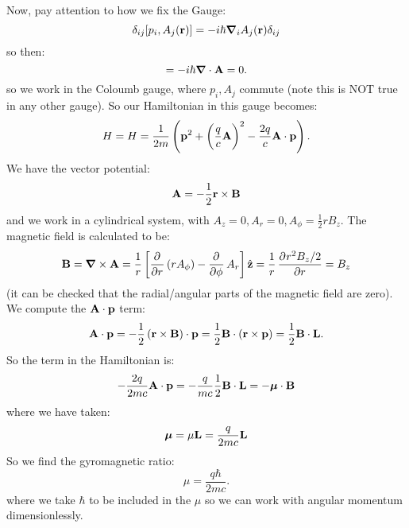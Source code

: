 Now, pay attention to how we fix the Gauge:
\begin{equation}
    \delta_{ij}[p_i, A_j(\v{r})] = -i\hbar \nabla_i A_j(\v{r})\delta_{ij}
\end{equation}
so then:
\begin{equation}
    [p_i, A_j] = -i\hbar \nabla \cdot \v{A} = 0.
\end{equation}
so we work in the Coloumb gauge, where $p_i, A_j$ commute (note this is NOT true in any other gauge). So our Hamiltonian in this gauge becomes:
\begin{equation}
    H =  H = \frac{1}{2m}\left(\mathbf{p}^2 + \left(\frac{q}{c}\mathbf{A}\right)^2 - \frac{2q}{c}\mathbf{A} \cdot \mathbf{p}\right).
\end{equation}
We have the vector potential:
\begin{equation}
    \mathbf{A} = -\frac{1}{2}\mathbf{r} \times \mathbf{B}
\end{equation}
and we work in a cylindrical system, with $A_z = 0, A_r = 0, A_\phi = \frac{1}{2}rB_z$. The magnetic field is calculated to be:
\begin{equation}
    \v{B} = \nabla \times \v{A} = \frac{1}{r}\left[\dpd{}{r}(rA_\phi) - \dpd{}{\phi}A_r\right]\zhat = \frac{1}{r}\dpd{r^2B_z/2}{r} = B_z
\end{equation}
(it can be checked that the radial/angular parts of the magnetic field are zero). We compute the $\mathbf{A} \cdot \mathbf{p}$ term:
\begin{equation}
    \mathbf{A} \cdot \mathbf{p} = -\frac{1}{2}\left(\mathbf{r} \times \mathbf{B}\right) \cdot \mathbf{p} = \frac{1}{2}\mathbf{B} \cdot (\mathbf{r} \times \mathbf{p}) = \frac{1}{2}\mathbf{B} \cdot \mathbf{L}.
\end{equation}
So the term in the Hamiltonian is:
\begin{equation}
    -\frac{2q}{2mc}\mathbf{A} \cdot \mathbf{p} = -\frac{q}{mc}\frac{1}{2}\mathbf{B} \cdot \mathbf{L} = -\mbox{\boldmath$ \mu $} \cdot \mathbf{B}
\end{equation}
where we have taken:
\begin{equation}
    \mbox{\boldmath$ \mu $} = \mu \mathbf{L} = \frac{q}{2mc}\mathbf{L}
\end{equation}
So we find the gyromagnetic ratio:
\begin{equation}
    \mu = \frac{q\hbar}{2mc}.
\end{equation}
where we take $\hbar$ to be included in the $\mu$ so we can work with angular momentum dimensionlessly.